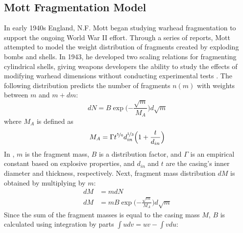 \subsection{Mott Fragmentation Model}



In early 1940s England, N.F. Mott began studying warhead fragmentation to support the ongoing World War II effort. Through a series of reports, Mott attempted to model the weight distribution of fragments created by exploding bombs and shells. In 1943, he developed two scaling relations for fragmenting cylindrical shells, giving weapons developers the ability to study the effects of modifying warhead dimensions without conducting experimental tests \cite{GradyMottLegacy}.     
The following distribution predicts the number of fragments $n(m)$ with weights between $m$ and $m + dm$: 
%
\begin{equation} %
	dN = B\exp\bigg({-\frac{\sqrt{m}}{M_{A}}}\bigg)d\sqrt{m}
    \label{eq:2_Mott1943_dN}
\end{equation}
%
where $M_{A}$ is defined as
%
\begin{equation} 
	M_{A} = {\Gamma}t^{\nicefrac{5}{6}}d_{in}^{\nicefrac{1}{3}}\Big(1+\frac{t}{d_{in}}\Big) 
    \label{eq:2_Mott1943Ma}
\end{equation}
%
In , $m$ is the fragment mass, $B$ is a distribution factor, and $\Gamma$ is an empirical constant based on explosive properties, and $d_{in}$ and $t$ are the casing's inner diameter and thickness, respectively. Next, fragment mass distribution $dM$ is obtained by multiplying  by $m$:
\begin{align}
dM &= mdN \nonumber \\
dM &= mB\exp\bigg({-\frac{\sqrt{m}}{M_{A}}}\bigg)d\sqrt{m}
 \label{eq:2_Mott1934_dM}
\end{align}
%
Since the sum of the fragment masses is equal to the casing mass $M$, $B$ is calculated using integration by parts $\int{udv} = uv - \int{vdu}$: 
